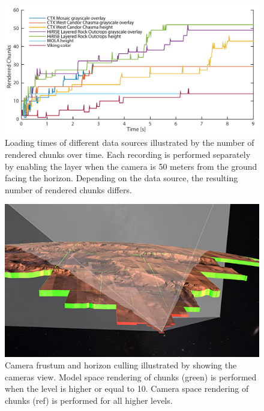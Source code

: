 \documentclass[journal]{vgtc}                %
\begin{document}
\begin{figure}
  \centering
    \includegraphics[width=1.0\linewidth]{figures/load_times.pdf}
  \caption{Loading times of different data sources illustrated by the number of rendered chunks over time. Each recording is performed separately by enabling the layer when the camera is 50 meters from the ground facing the horizon. Depending on the data source, the resulting number of rendered chunks differs.}  \vspace*{-4mm}
  \label{fig:load-times}
  \end{figure}

\begin{figure}
    \centering
    	\includegraphics[width=1.0\linewidth]{figures/frustum_mars.jpg}
        \caption{Camera frustum and horizon culling illustrated by showing the cameras view. Model space rendering of chunks (green) is performed when the level is higher or equal to 10. Camera space rendering of chunks (ref) is performed for all higher levels.}\vspace*{-4mm}
    \label{fig:frustum_mars}
\end{figure}
\end{document}
